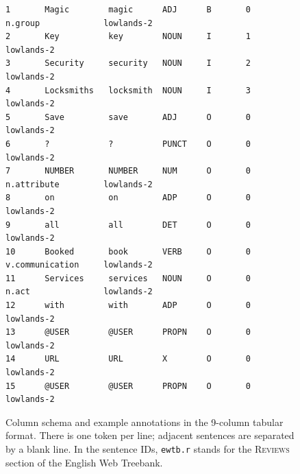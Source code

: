 \documentclass[11pt,letterpaper]{article}
\begin{document}
\begin{figure}
\begin{verbatim}
1       Magic        magic      ADJ      B       0               n.group             lowlands-2
2       Key          key        NOUN     I       1                                   lowlands-2
3       Security     security   NOUN     I       2                                   lowlands-2
4       Locksmiths   locksmith  NOUN     I       3                                   lowlands-2
5       Save         save       ADJ      O       0                                   lowlands-2
6       ?            ?          PUNCT    O       0                                   lowlands-2
7       NUMBER       NUMBER     NUM      O       0               n.attribute         lowlands-2
8       on           on         ADP      O       0                                   lowlands-2
9       all          all        DET      O       0                                   lowlands-2
10      Booked       book       VERB     O       0               v.communication     lowlands-2
11      Services     services   NOUN     O       0               n.act               lowlands-2
12      with         with       ADP      O       0                                   lowlands-2
13      @USER        @USER      PROPN    O       0                                   lowlands-2
14      URL          URL        X        O       0                                   lowlands-2
15      @USER        @USER      PROPN    O       0                                   lowlands-2
\end{verbatim}
\caption{Column schema and example annotations in the 9-column tabular format.
There is one token per line; adjacent sentences are separated by a blank line.
In the sentence IDs, \texttt{ewtb.r} stands for the \textsc{Reviews} section of the English Web Treebank.}
\label{fig:tagsformat}
\end{figure}


\setlength{\bibsep}{10pt}
{\fontsize{10}{12.25}\selectfont
}
\end{document}
